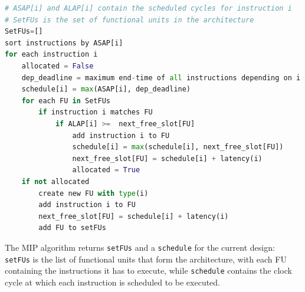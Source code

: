 \begin{lstlisting}[language=Python, caption={\small Modified Interval Partitioning Algorithm}, label={lst:modified_interval_partitioning}, basicstyle=\tiny]
# ASAP[i] and ALAP[i] contain the scheduled cycles for instruction i
# SetFUs is the set of functional units in the architecture
SetFUs=[]
sort instructions by ASAP[i]
for each instruction i
	allocated = False
	dep_deadline = maximum end-time of all instructions depending on i
	schedule[i] = max(ASAP[i], dep_deadline)
	for each FU in SetFUs
		if instruction i matches FU
			if ALAP[i] >=  next_free_slot[FU]
				add instruction i to FU
				schedule[i] = max(schedule[i], next_free_slot[FU])
				next_free_slot[FU] = schedule[i] + latency(i)
				allocated = True
	if not allocated
		create new FU with type(i)
		add instruction i to FU
		next_free_slot[FU] = schedule[i] + latency(i)
		add FU to setFUs
\end{lstlisting}


The MIP algorithm returns \verb|setFUs| and a \verb|schedule| for the current design: \verb|setFUs| is the list of functional units that form the architecture, with each FU containing the instructions it has to execute, while \verb|schedule| contains the clock cycle at which each instruction is scheduled to be executed.

\vspace{-1mm}
